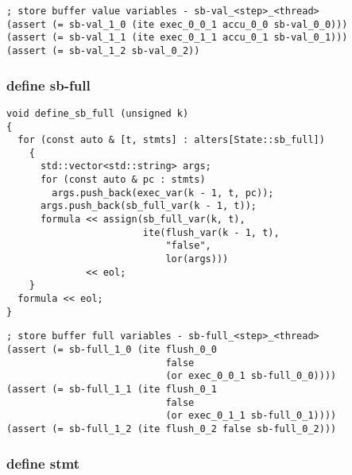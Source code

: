 \begin{lstlisting}[language=SMTLib]
; store buffer value variables - sb-val_<step>_<thread>
(assert (= sb-val_1_0 (ite exec_0_0_1 accu_0_0 sb-val_0_0)))
(assert (= sb-val_1_1 (ite exec_0_1_1 accu_0_1 sb-val_0_1)))
(assert (= sb-val_1_2 sb-val_0_2))
\end{lstlisting}

\subsubsection{define sb-full}

\begin{lstlisting}[style=c++]
void define_sb_full (unsigned k)
{
  for (const auto & [t, stmts] : alters[State::sb_full])
    {
      std::vector<std::string> args;
      for (const auto & pc : stmts)
        args.push_back(exec_var(k - 1, t, pc));
      args.push_back(sb_full_var(k - 1, t));
      formula << assign(sb_full_var(k, t),
                        ite(flush_var(k - 1, t),
                            "false",
                            lor(args)))
              << eol;
    }
  formula << eol;
}
\end{lstlisting}

\begin{lstlisting}[language=SMTLib]
; store buffer full variables - sb-full_<step>_<thread>
(assert (= sb-full_1_0 (ite flush_0_0
                            false
                            (or exec_0_0_1 sb-full_0_0))))
(assert (= sb-full_1_1 (ite flush_0_1
                            false
                            (or exec_0_1_1 sb-full_0_1))))
(assert (= sb-full_1_2 (ite flush_0_2 false sb-full_0_2)))
\end{lstlisting}

\subsubsection{define stmt}

